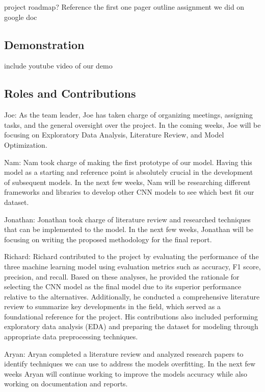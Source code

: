 \documentclass[conference]{IEEEtran}
\begin{document}
project roadmap? Reference the first one pager outline assignment we did on google doc
\subsection{\large Demonstration}
include youtube video of our demo

\subsection{\large Roles and Contributions}

Joe: As the team leader, Joe has taken charge of organizing meetings, assigning tasks, and the general oversight over the project. In the coming weeks, Joe will be focusing on Exploratory Data Analysis, Literature Review, and Model Optimization. 

Nam: Nam took charge of making the first prototype of our model. Having this model as a starting and reference point is absolutely crucial in the development of subsequent models. In the next few weeks, Nam will be researching different frameworks and libraries to develop other CNN models to see which best fit our dataset.

Jonathan: Jonathan took charge of literature review and researched techniques that can be implemented to the model. In the next few weeks, Jonathan will be focusing on writing the proposed methodology for the final report.

Richard: Richard contributed to the project by evaluating the performance of the three machine learning model using evaluation metrics such as accuracy, F1 score, precision, and recall. Based on these analyses, he provided the rationale for selecting the CNN model as the final model due to its superior performance relative to the alternatives. Additionally, he conducted a comprehensive literature review to summarize key developments in the field, which served as a foundational reference for the project. His contributions also included performing exploratory data analysis (EDA) and preparing the dataset for modeling through appropriate data preprocessing techniques.

Aryan: Aryan completed a literature review and analyzed research papers to identify techniques we can use to address the models overfitting. In the next few weeks Aryan will continue working to improve the models accuracy while also working on documentation and reports. 
\end{document}
